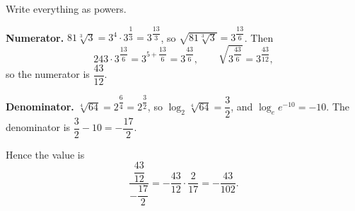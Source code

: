 Write everything as powers.

\textbf{Numerator.} $81\sqrt[3]3=3^4\cdot3^{\dfrac{1}{3}}=3^{\dfrac{13}{3}}$, so $\sqrt{81\sqrt[3]3}=3^{\dfrac{13}{6}}$. Then
\[
243\cdot3^{\dfrac{13}{6}}=3^{5+\dfrac{13}{6}}=3^{\dfrac{43}{6}},\qquad \sqrt{3^{\dfrac{43}{6}}}=3^{\dfrac{43}{12}},
\]
so the numerator is $\dfrac{43}{12}$.

\textbf{Denominator.} $\sqrt[4]{64}=2^{\dfrac{6}{4}}=2^{\dfrac{3}{2}}$, so $\log_2\sqrt[4]{64}=\dfrac{3}{2}$, and $\log_ee^{-10}=-10$. The denominator is $\dfrac{3}{2}-10=-\dfrac{17}{2}$.

Hence the value is
\[
\dfrac{\dfrac{43}{12}}{-\dfrac{17}{2}}=-\dfrac{43}{12}\cdot\dfrac{2}{17}=\boxed{-\dfrac{43}{102}}.
\]
